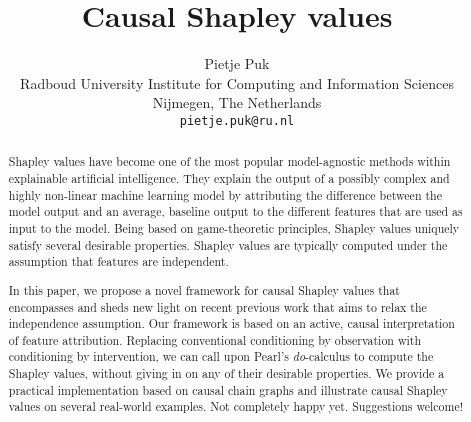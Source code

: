 \documentclass{article}
\title{Causal Shapley values}
\author{%
  Pietje Puk\\
  Radboud University
  Institute for Computing and Information Sciences\\
  Nijmegen, The Netherlands \\
  \texttt{pietje.puk@ru.nl} \\
}
\newcommand{\comment}[1]{{\color{red} #1}}
\begin{document}
\maketitle

\begin{abstract}
	Shapley values have become one of the most popular model-agnostic methods within explainable artificial intelligence. They explain the output of a possibly complex and highly non-linear machine learning model by attributing the difference between the model output and an average, baseline output to the different features that are used as input to the model. Being based on game-theoretic principles, Shapley values uniquely satisfy several desirable properties. Shapley values are typically computed under the assumption that features are independent.
	
	In this paper, we propose a novel framework for causal Shapley values that encompasses and sheds new light on recent previous work that aims to relax the independence assumption. Our framework is based on an active, causal interpretation of feature attribution. Replacing conventional conditioning by observation with conditioning by intervention, we can call upon Pearl's \textit{do}-calculus to compute the Shapley values, without giving in on any of their desirable properties. We provide a practical implementation based on causal chain graphs and illustrate causal Shapley values on several real-world examples.	\comment{Not completely happy yet. Suggestions welcome!}
\end{abstract}






\end{document}
